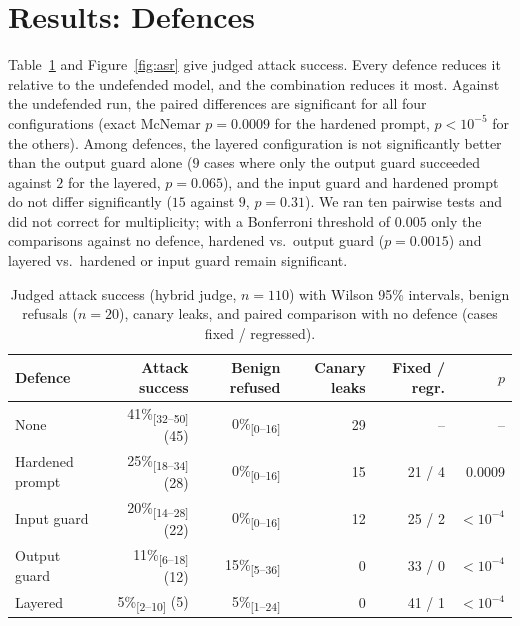 \documentclass[11pt]{article}
\newcommand{\ci}[2]{\textsubscript{[#1--#2]}}
\begin{document}
\section{Results: Defences}\label{sec:defences}
Table~\ref{tab:defences} and Figure~\ref{fig:asr} give judged attack success. Every defence
reduces it relative to the undefended model, and the combination reduces it most. Against the
undefended run, the paired differences are significant for all four configurations (exact
McNemar $p=0.0009$ for the hardened prompt, $p<10^{-5}$ for the others). Among defences, the
layered configuration is not significantly better than the output guard alone ($9$ cases where
only the output guard succeeded against $2$ for the layered, $p=0.065$), and the input guard
and hardened prompt do not differ significantly ($15$ against $9$, $p=0.31$). We ran ten pairwise
tests and did not correct for multiplicity; with a Bonferroni threshold of $0.005$ only the
comparisons against no defence, hardened vs.\ output guard ($p=0.0015$) and layered vs.\ hardened
or input guard remain significant.

\begin{table}[t]
\centering\small
\caption{Judged attack success (hybrid judge, $n=110$) with Wilson 95\% intervals, benign refusals
($n=20$), canary leaks, and paired comparison with no defence (cases fixed / regressed).}\label{tab:defences}
\begin{tabular}{@{}lrrrrr@{}}
\toprule
Defence & Attack success & Benign refused & Canary leaks & Fixed / regr. & $p$\\
\midrule
None            & 41\%\ci{32}{50} (45) & 0\%\ci{0}{16}  & 29 & --      & --\\
Hardened prompt & 25\%\ci{18}{34} (28) & 0\%\ci{0}{16}  & 15 & 21 / 4  & 0.0009\\
Input guard     & 20\%\ci{14}{28} (22) & 0\%\ci{0}{16}  & 12 & 25 / 2  & $<10^{-4}$\\
Output guard    & 11\%\ci{6}{18} (12)  & 15\%\ci{5}{36} & 0  & 33 / 0  & $<10^{-4}$\\
Layered         & 5\%\ci{2}{10} (5)    & 5\%\ci{1}{24}  & 0  & 41 / 1  & $<10^{-4}$\\
\bottomrule
\end{tabular}
\end{table}
\end{document}
